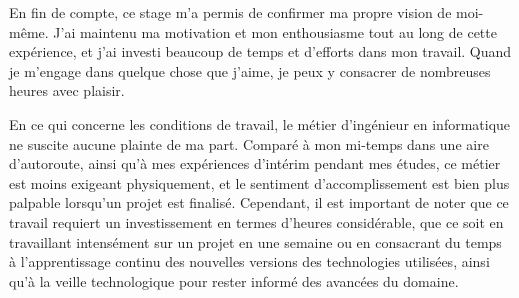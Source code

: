 En fin de compte, ce stage m'a permis de confirmer ma propre vision de moi-même. J'ai maintenu ma motivation et mon enthousiasme tout au long de cette expérience, et j'ai investi beaucoup de temps et d'efforts dans mon travail. Quand je m'engage dans quelque chose que j'aime, je peux y consacrer de nombreuses heures avec plaisir.

\medskip

En ce qui concerne les conditions de travail, le métier d'ingénieur en informatique ne suscite aucune plainte de ma part. Comparé à mon mi-temps dans une aire d'autoroute, ainsi qu'à mes expériences d'intérim pendant mes études, ce métier est moins exigeant physiquement, et le sentiment d'accomplissement est bien plus palpable lorsqu'un projet est finalisé. Cependant, il est important de noter que ce travail requiert un investissement en termes d'heures considérable, que ce soit en travaillant intensément sur un projet en une semaine ou en consacrant du temps à l'apprentissage continu des nouvelles versions des technologies utilisées, ainsi qu'à la veille technologique pour rester informé des avancées du domaine.